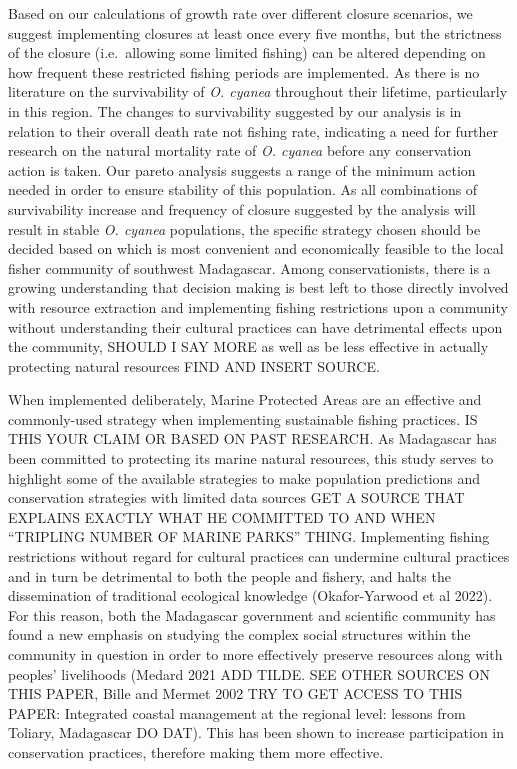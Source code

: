 \documentclass[
]{article}
\begin{document}
Based on our calculations of growth rate over different closure scenarios, we suggest implementing closures at least once every five months, but the strictness of the closure (i.e.~allowing some limited fishing) can be altered depending on how frequent these restricted fishing periods are implemented. As there is no literature on the survivability of \emph{O. cyanea} throughout their lifetime, particularly in this region. The changes to survivability suggested by our analysis is in relation to their overall death rate not fishing rate, indicating a need for further research on the natural mortality rate of \emph{O. cyanea} before any conservation action is taken. Our pareto analysis suggests a range of the minimum action needed in order to ensure stability of this population. As all combinations of survivability increase and frequency of closure suggested by the analysis will result in stable \emph{O. cyanea} populations, the specific strategy chosen should be decided based on which is most convenient and economically feasible to the local fisher community of southwest Madagascar. Among conservationists, there is a growing understanding that decision making is best left to those directly involved with resource extraction and implementing fishing restrictions upon a community without understanding their cultural practices can have detrimental effects upon the community, SHOULD I SAY MORE as well as be less effective in actually protecting natural resources FIND AND INSERT SOURCE.

When implemented deliberately, Marine Protected Areas are an effective and commonly-used strategy when implementing sustainable fishing practices. IS THIS YOUR CLAIM OR BASED ON PAST RESEARCH. As Madagascar has been committed to protecting its marine natural resources, this study serves to highlight some of the available strategies to make population predictions and conservation strategies with limited data sources GET A SOURCE THAT EXPLAINS EXACTLY WHAT HE COMMITTED TO AND WHEN ``TRIPLING NUMBER OF MARINE PARKS'' THING. Implementing fishing restrictions without regard for cultural practices can undermine cultural practices and in turn be detrimental to both the people and fishery, and halts the dissemination of traditional ecological knowledge (Okafor-Yarwood et al 2022). For this reason, both the Madagascar government and scientific community has found a new emphasis on studying the complex social structures within the community in question in order to more effectively preserve resources along with peoples' livelihoods (Medard 2021 ADD TILDE. SEE OTHER SOURCES ON THIS PAPER, Bille and Mermet 2002 TRY TO GET ACCESS TO THIS PAPER: Integrated coastal management at the regional level: lessons from Toliary, Madagascar DO DAT). This has been shown to increase participation in conservation practices, therefore making them more effective.
\end{document}

